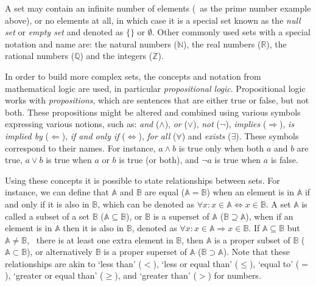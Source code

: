 A set may contain an infinite number of elements (\eg\ as the prime number example above), or no elements at all, in which case it is a special set known as the \emph{null set} or \emph{empty set} and denoted as \(\{ \}\) or \(\emptyset\).
Other commonly used sets with a special notation and name are: the natural numbers (\(\mathbb{N}\)), the real numbers (\(\mathbb{R}\)), the rational numbers (\(\mathbb{Q}\)) and the integers (\(\mathbb{Z}\)).

In order to build more complex sets, the concepts and notation from mathematical logic are used, in particular \emph{propositional logic}.
Propositional logic works with \emph{propositions}, which are sentences that are either true or false, but not both.
These propositions might be altered and combined using various symbols expressing various notions, such as: \emph{and} (\(\wedge\)), \emph{or} (\(\vee\)), \emph{not} (\(\neg\)), \emph{implies} (\(\Rightarrow\)), \emph{is implied by} (\(\Leftarrow\)), \emph{if and only if} (\(\Leftrightarrow\)), \emph{for all} (\(\forall\)) and \emph{exists} (\(\exists\)).
These symbols correspond to their names.
For instance, \(a \wedge b\) is true only when both \(a\) and \(b\) are true, \(a \vee b\) is true when \(a\) or \(b\) is true (or both), and \(\neg a\) is true when \(a\) is false.

Using these concepts it is possible to state relationships between sets.
For instance, we can define that \(\mathbb{A}\) and \(\mathbb{B}\) are equal (\(\mathbb{A} = \mathbb{B}\)) when an element is in \(\mathbb{A}\) if and only if it is also in \(\mathbb{B}\), which can be denoted as \(\forall x : x \in \mathbb{A} \Leftrightarrow x \in \mathbb{B}\).
A set \(\mathbb{A}\) is called a subset of a set \(\mathbb{B}\) (\(\mathbb{A} \subseteq \mathbb{B}\)), or \(\mathbb{B}\) is a superset of \(\mathbb{A}\) (\(\mathbb{B} \supseteq \mathbb{A}\)), when if an element is in \(\mathbb{A}\) then it is also in \(\mathbb{B}\), denoted as \(\forall x : x \in \mathbb{A} \Rightarrow x \in \mathbb{B}\).
If \(\mathbb{A} \subseteq \mathbb{B}\) but \(\mathbb{A} \neq \mathbb{B}\), \ie\ there is at least one extra element in \(\mathbb{B}\), then \(\mathbb{A}\) is a proper subset of \(\mathbb{B}\) (\(\mathbb{A} \subset \mathbb{B}\)), or alternatively \(\mathbb{B}\) is a proper superset of \(\mathbb{A}\) (\(\mathbb{B} \supset \mathbb{A}\)).
Note that these relationships are akin to `less than' (\(<\)), `less or equal than' (\(\leq\)), `equal to' (\(=\)), `greater or equal than' (\(\geq\)), and `greater than' (\(>\)) for numbers.

